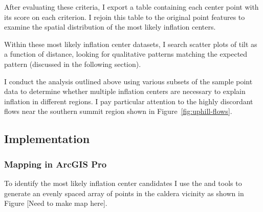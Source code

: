 After evaluating these criteria, I export a table containing each center point with its score on each criterion. I rejoin this table to the original point features to examine the spatial distribution of the most likely inflation centers.

Within these most likely inflation center datasets, I search scatter plots of tilt as a function of distance, looking for qualitative patterns matching the expected pattern (discussed in the following section).

I conduct the analysis outlined above using various subsets of the sample point data to determine whether multiple inflation centers are necessary to explain inflation in different regions. I pay particular attention to the highly discordant flows near the southern summit region shown in Figure~\ref{fig:uphill-flows}.

\subsection{Implementation}

\subsubsection{Mapping in ArcGIS Pro}

To identify the most likely inflation center candidates I use the  and  tools to generate an evenly spaced array of points in the caldera vicinity as shown in Figure [Need to make map here].

